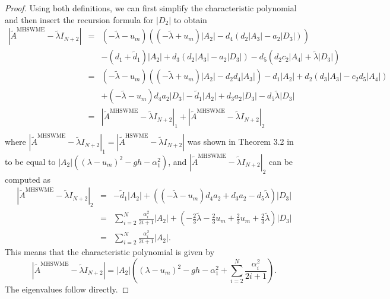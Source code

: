 \documentclass[a4paper, 11pt]{article}
\begin{document}
\begin{proof}
    Using both definitions, we can first simplify the characteristic polynomial and then insert the recursion formula for $\left|D_2\right|$ to obtain
    \begin{eqnarray*}
        \left| \widetilde{A}^{\textrm{MHSWME}} - \widetilde{\lambda} I_{N+2} \right| &=& (-\widetilde{\lambda} - u_m)  \left( (-\widetilde{\lambda} + u_m)  \left|A_2\right| - d_4 \left( d_{2} \left|A_{3}\right| - a_{2}\left|D_{3}\right| \right) \right) \\
        && - (d_1+\widetilde{d}_{{1}})  \left|A_2\right| + d_3  \left( d_{2} \left|A_{3}\right| - a_{2}\left|D_{3}\right| \right) - d_5 \left( d_{2} c_2  \left|A_4\right|  + \widetilde{\lambda} \left|D_3\right| \right) \\
        &=& (-\widetilde{\lambda} - u_m)  \left( (-\widetilde{\lambda} + u_m)  \left|A_2\right| - d_2 d_4  \left|A_3\right| \right) - d_1 \left|A_2\right| + d_2 \left( d_3 \left|A_3\right| - c_2 d_5 \left|A_4\right| \right) \\
        && + (-\widetilde{\lambda} - u_m) d_4 a_2 \left|D_{3}\right| - \widetilde{d}_{{1}}  \left|A_2\right| + d_3 a_2 \left|D_{3}\right| - d_5 \widetilde{\lambda} \left|D_{3}\right|\\
        &=& \left| \widetilde{A}^{\textrm{MHSWME}} - \widetilde{\lambda} I_{N+2} \right|_1 + \left| \widetilde{A}^{\textrm{MHSWME}} - \widetilde{\lambda} I_{N+2} \right|_2\\
    \end{eqnarray*}
    where $\left| \widetilde{A}^{\textrm{MHSWME}} - \widetilde{\lambda} I_{N+2} \right|_1= \left| \widetilde{A}^{\textrm{HSWME}} - \widetilde{\lambda} I_{N+2} \right|$ was shown in Theorem 3.2 in \cite{Koellermeier2020c} to be equal to $\left|A_2\right| \left( \left(\lambda - u_m\right)^2 -gh -\alpha_1^2 \right)$, and $\left| \widetilde{A}^{\textrm{MHSWME}} - \widetilde{\lambda} I_{N+2} \right|_2$ can be computed as
    \begin{eqnarray*}
        \left| \widetilde{A}^{\textrm{MHSWME}} - \widetilde{\lambda} I_{N+2} \right|_2 &=& - \widetilde{d}_{{1}}  \left|A_2\right| + \left((-\widetilde{\lambda} - u_m) d_4 a_2  + d_3 a_2 - d_5 \widetilde{\lambda} \right) \left|D_{3}\right|\\
        &=& \sum\limits_{i=2}^N \frac{\alpha_i^2}{2i+1} \left|A_2\right| + \left( -\frac{2}{3} \widetilde{\lambda} - \frac{2}{3} u_m + \frac{2}{3}u_m + \frac{2}{3}\widetilde{\lambda} \right) \left|D_{3}\right|\\
        &=& \sum\limits_{i=2}^N \frac{\alpha_i^2}{2i+1} \left|A_2\right|.
    \end{eqnarray*}
    This means that the characteristic polynomial is given by
    \begin{equation}
        \left| \widetilde{A}^{\textrm{MHSWME}} - \widetilde{\lambda} I_{N+2} \right| = \left|A_2\right| \left( \left(\lambda - u_m\right)^2 -gh - \alpha_1^2 + \sum\limits_{i=2}^N \frac{\alpha_i^2}{2i+1}\right).
    \end{equation}
    The eigenvalues follow directly.
\end{proof}
\end{document}
